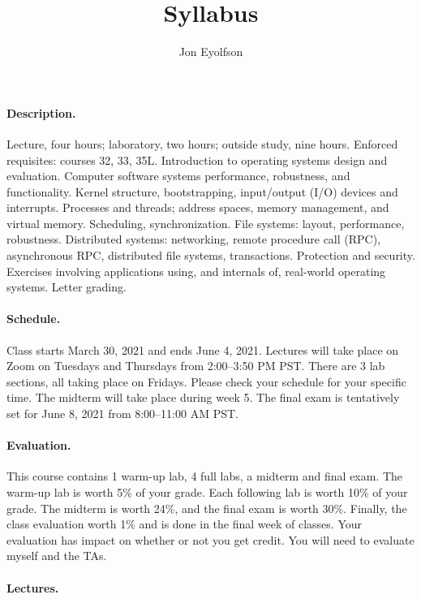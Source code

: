 \documentclass[12pt]{article}
\title{Syllabus}
\author{Jon Eyolfson}
\begin{document}

\noindent {\Large \bfseries \color{uclablue} \thetitle}

\noindent {\normalsize \theauthor}

\paragraph{Description.}

Lecture, four hours; laboratory, two hours; outside study, nine hours.
Enforced requisites: courses 32, 33, 35L.
Introduction to operating systems design and evaluation.
Computer software systems performance, robustness, and functionality.
Kernel structure, bootstrapping, input/output (I/O) devices and interrupts.
Processes and threads; address spaces, memory management, and virtual memory.
Scheduling, synchronization.
File systems: layout, performance, robustness.
Distributed systems: networking, remote procedure call (RPC), asynchronous RPC,
distributed file systems, transactions.
Protection and security.
Exercises involving applications using, and internals of, real-world operating
systems.
Letter grading.

\paragraph{Schedule.}

Class starts March 30, 2021 and ends June 4, 2021.
Lectures will take place on Zoom on Tuesdays and Thursdays from 2:00--3:50 PM
PST.
There are 3 lab sections, all taking place on Fridays.
Please check your schedule for your specific time.
The midterm will take place during week 5.
The final exam is tentatively set for June 8, 2021 from 8:00--11:00 AM PST.

\paragraph{Evaluation.}

This course contains 1 warm-up lab, 4 full labs, a midterm and final exam.
The warm-up lab is worth 5\% of your grade.
Each following lab is worth 10\% of your grade.
The midterm is worth 24\%, and the final exam is worth 30\%.
Finally, the class evaluation worth 1\% and is done in the final week of classes.
Your evaluation has impact on whether or not you get credit.
You will need to evaluate myself and the TAs.

\paragraph{Lectures.}
\end{document}
